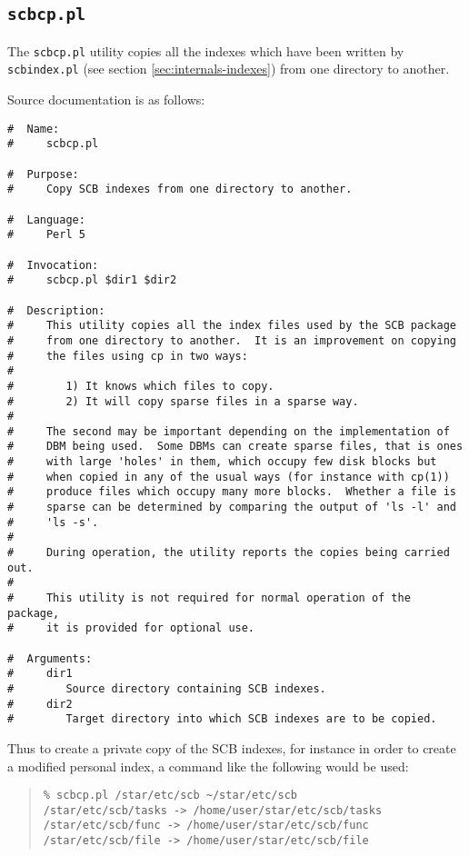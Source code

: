 \documentclass[twoside,11pt]{article}
\newcommand{\xlabel}[1]{}
\renewcommand{\_}{\texttt{\symbol{95}}}
\begin{document}
\subsection{\xlabel{sec:scbcp}\label{sec:scbcp}{\tt scbcp.pl}}

The {\tt scbcp.pl} utility copies all the indexes which have
been written by {\tt scbindex.pl} (see section \ref{sec:internals-indexes})
from one directory to another.

Source documentation is as follows:
\begin{verbatim}
#  Name:
#     scbcp.pl

#  Purpose:
#     Copy SCB indexes from one directory to another.

#  Language:
#     Perl 5

#  Invocation:
#     scbcp.pl $dir1 $dir2

#  Description:
#     This utility copies all the index files used by the SCB package
#     from one directory to another.  It is an improvement on copying
#     the files using cp in two ways:
#
#        1) It knows which files to copy.
#        2) It will copy sparse files in a sparse way.
#
#     The second may be important depending on the implementation of
#     DBM being used.  Some DBMs can create sparse files, that is ones
#     with large 'holes' in them, which occupy few disk blocks but
#     when copied in any of the usual ways (for instance with cp(1))
#     produce files which occupy many more blocks.  Whether a file is
#     sparse can be determined by comparing the output of 'ls -l' and
#     'ls -s'.
#
#     During operation, the utility reports the copies being carried out.
#
#     This utility is not required for normal operation of the package,
#     it is provided for optional use.

#  Arguments:
#     dir1
#        Source directory containing SCB indexes.
#     dir2
#        Target directory into which SCB indexes are to be copied.
\end{verbatim}
Thus to create a private copy of the SCB indexes, for instance
in order to create a modified personal index, a command like the
following would be used:
\begin{quote}
\begin{verbatim}
% scbcp.pl /star/etc/scb ~/star/etc/scb
/star/etc/scb/tasks -> /home/user/star/etc/scb/tasks
/star/etc/scb/func -> /home/user/star/etc/scb/func
/star/etc/scb/file -> /home/user/star/etc/scb/file
\end{verbatim}
\end{quote}


\end{document}
